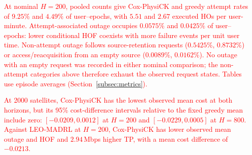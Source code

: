 \documentclass[10pt,letterpaper,journal]{IEEEtran}
\newcommand{\revnew}[1]{\textcolor{red}{#1}}
\begin{document}
\revnew{At nominal $H=200$, pooled counts give Cox-PhysiCK and greedy attempt rates of $9.25\%$ and $4.49\%$ of user--epochs, with $5.51$ and $2.67$ executed HOs per user-minute. Attempt-associated outage occupies $0.0575\%$ and $0.0425\%$ of user--epochs: lower conditional HOF coexists with more failure events per unit user time. Non-attempt outage follows source-retention requests ($0.5425\%$, $0.8732\%$) or access/reacquisition from an empty source ($0.0089\%$, $0.0162\%$). No outage with an empty request was recorded in either nominal comparison; the non-attempt categories above therefore exhaust the observed request states. Tables use episode averages (Section~\ref{subsec:metrics}).}

\revnew{At 2000 satellites, Cox-PhysiCK has the lowest observed mean cost at both horizons, but its 95\% cost-difference intervals relative to the fixed greedy mean include zero: $[-0.0209,0.0012]$ at $H=200$ and $[-0.0229,0.0005]$ at $H=800$. Against LEO-MADRL at $H=200$, Cox-PhysiCK has lower observed mean outage and HOF and $2.94$\,Mbps higher TP, with a mean cost difference of $-0.0213$.}
\end{document}
